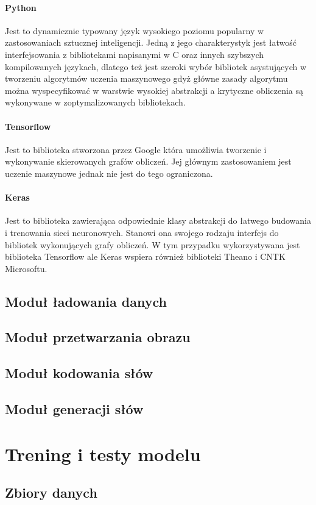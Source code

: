 \paragraph*{Python} Jest to dynamicznie typowany język wysokiego poziomu popularny w zastosowaniach sztucznej inteligencji. Jedną z jego charakterystyk jest łatwość interfejsowania z bibliotekami napisanymi w C oraz innych szybszych kompilowanych językach, dlatego też jest szeroki wybór bibliotek asystujących w tworzeniu algorytmów uczenia maszynowego gdyż główne zasady algorytmu można wyspecyfikować w warstwie wysokiej abstrakcji a krytyczne obliczenia są wykonywane w zoptymalizowanych bibliotekach.
\paragraph*{Tensorflow} Jest to biblioteka stworzona przez Google która umożliwia tworzenie i wykonywanie skierowanych grafów obliczeń. Jej głównym zastosowaniem jest uczenie maszynowe jednak nie jest do tego ograniczona.
\paragraph*{Keras} Jest to biblioteka zawierająca odpowiednie klasy abstrakcji do łatwego budowania i trenowania sieci neuronowych. Stanowi ona swojego rodzaju interfejs do bibliotek wykonujących grafy obliczeń. W tym przypadku wykorzystywana jest biblioteka Tensorflow ale Keras wspiera również biblioteki Theano i CNTK Microsoftu.
\subsection{Moduł ładowania danych}
\subsection{Moduł przetwarzania obrazu}
\subsection{Moduł kodowania słów}
\subsection{Moduł generacji słów}
\section{Trening i testy modelu}
\subsection{Zbiory danych}
